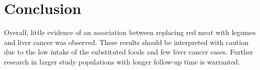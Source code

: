 \documentclass[nutrients,article,submit,moreauthors,pdftex]{Definitions/mdpi}
\begin{document}
\hypertarget{sec5}{%
\section{Conclusion}\label{sec5}}

Overall, little evidence of an association between replacing red meat
with legumes and liver cancer was observed. These results should be
interpreted with caution due to the low intake of the substituted foods
and few liver cancer cases. Further research in larger study populations
with longer follow-up time is warranted.


\vspace{6pt}












\end{document}
